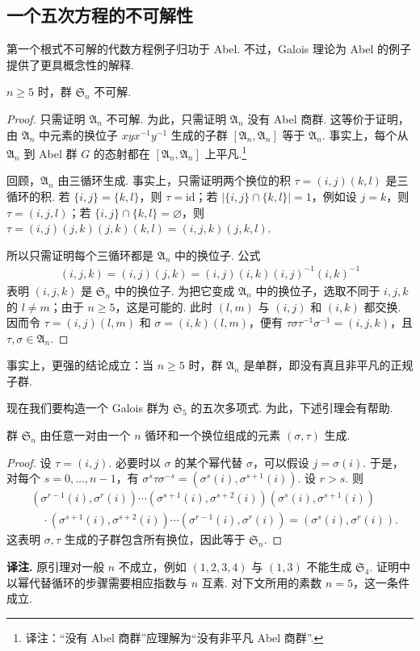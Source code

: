 \subsection{一个五次方程的不可解性}\label{sec:galois-2-8-4}
第一个根式不可解的代数方程例子归功于 Abel. 不过，Galois 理论为 Abel 的例子提供了更具概念性的解释.
\begin{lemma*}
$n\geq5$ 时，群 $\mathfrak S_n$ 不可解.
\end{lemma*}
\begin{proof}
只需证明 $\mathfrak A_n$ 不可解. 为此，只需证明 $\mathfrak A_n$ 没有 Abel 商群. 这等价于证明，由 $\mathfrak A_n$ 中元素的换位子 $xyx^{-1}y^{-1}$ 生成的子群 $[\mathfrak A_n,\mathfrak A_n]$ 等于 $\mathfrak A_n$. 事实上，每个从 $\mathfrak A_n$ 到 Abel 群 $G$ 的态射都在 $[\mathfrak A_n,\mathfrak A_n]$ 上平凡.\footnote{译注：``没有 Abel 商群''应理解为``没有非平凡 Abel 商群''.}

回顾，$\mathfrak A_n$ 由三循环生成. 事实上，只需证明两个换位的积 $\tau=(i,j)(k,l)$ 是三循环的积. 若 $\{i,j\}=\{k,l\}$，则 $\tau=\mathrm{id}$；若 $|\{i,j\}\cap\{k,l\}|=1$，例如设 $j=k$，则 $\tau=(i,j,l)$；若 $\{i,j\}\cap\{k,l\}=\varnothing$，则 $\tau=(i,j)(j,k)(j,k)(k,l)=(i,j,k)(j,k,l)$.

所以只需证明每个三循环都是 $\mathfrak A_n$ 中的换位子. 公式
\begin{align*}(i,j,k)=(i,j)(j,k)=(i,j)(i,k)(i,j)^{-1}(i,k)^{-1}\end{align*}
表明 $(i,j,k)$ 是 $\mathfrak S_n$ 中的换位子. 为把它变成 $\mathfrak A_n$ 中的换位子，选取不同于 $i,j,k$ 的 $l\ne m$；由于 $n\geq5$，这是可能的. 此时 $(l,m)$ 与 $(i,j)$ 和 $(i,k)$ 都交换. 因而令 $\tau=(i,j)(l,m)$ 和 $\sigma=(i,k)(l,m)$，便有 $\tau\sigma\tau^{-1}\sigma^{-1}=(i,j,k)$，且 $\tau,\sigma\in\mathfrak A_n$.
\end{proof}
\begin{remark*}
事实上，更强的结论成立：当 $n\geq5$ 时，群 $\mathfrak A_n$ 是单群，即没有真且非平凡的正规子群.
\end{remark*}
现在我们要构造一个 Galois 群为 $\mathfrak S_5$ 的五次多项式. 为此，下述引理会有帮助.
\begin{lemma*}
群 $\mathfrak S_n$ 由任意一对由一个 $n$ 循环和一个换位组成的元素 $(\sigma,\tau)$ 生成.
\end{lemma*}
\begin{proof}
设 $\tau=(i,j)$. 必要时以 $\sigma$ 的某个幂代替 $\sigma$，可以假设 $j=\sigma(i)$. 于是，对每个 $s=0,\ldots,n-1$，有 $\sigma^s\tau\sigma^{-s}=(\sigma^s(i),\sigma^{s+1}(i))$. 设 $r>s$. 则
\begin{align*}
&(\sigma^{r-1}(i),\sigma^r(i))\cdots(\sigma^{s+1}(i),\sigma^{s+2}(i))(\sigma^s(i),\sigma^{s+1}(i))\\
&\quad\cdot(\sigma^{s+1}(i),\sigma^{s+2}(i))\cdots(\sigma^{r-1}(i),\sigma^r(i))
=(\sigma^s(i),\sigma^r(i)).
\end{align*}
这表明 $\sigma,\tau$ 生成的子群包含所有换位，因此等于 $\mathfrak S_n$.
\end{proof}
\noindent\textbf{译注.} 原引理对一般 $n$ 不成立，例如 $(1,2,3,4)$ 与 $(1,3)$ 不能生成 $\mathfrak S_4$. 证明中以幂代替循环的步骤需要相应指数与 $n$ 互素. 对下文所用的素数 $n=5$，这一条件成立.

